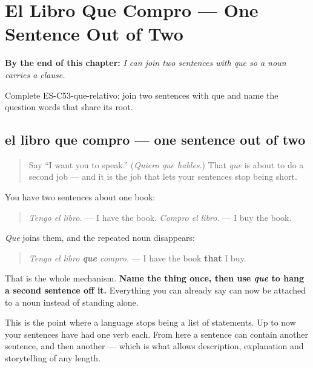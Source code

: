 
\chapter{El Libro Que Compro --- One Sentence Out of Two}
\label{ch:relative-que}

\begin{chapteropening}
\textbf{By the end of this chapter:} \emph{I can join two sentences with que so a noun carries a clause.}

Complete ES-C53-que-relativo: join two sentences with que and name the question words that share its root.
\end{chapteropening}

\section[el libro que compro]{el libro que compro — one sentence out of two}

\label{lesson:ES-C53-que-relativo}



\begin{quote}
Say \textquotedblleft{}I want you to speak.\textquotedblright{} (\emph{Quiero que hables}.) That \emph{que} is about to do a second job — and it is the job that lets your sentences stop being short.
\end{quote}

\begin{grammarlens}[title={Grammar Lens: stapling two sentences together}]
You have two sentences about one book:

\begin{quote}
\emph{Tengo el libro.} — I have the book. \emph{Compro el libro.} — I buy the book.
\end{quote}

\emph{Que} joins them, and the repeated noun disappears:

\begin{quote}
\emph{Tengo el libro \textbf{que} compro.} — I have the book \textbf{that} I buy.
\end{quote}

That is the whole mechanism. \textbf{Name the thing once, then use \emph{que} to hang a second sentence off it.} Everything you can already say can now be attached to a noun instead of standing alone.

This is the point where a language stops being a list of statements. Up to now your sentences have had one verb each. From here a sentence can contain another sentence, and then another — which is what allows description, explanation and storytelling of any length.
\end{grammarlens}

